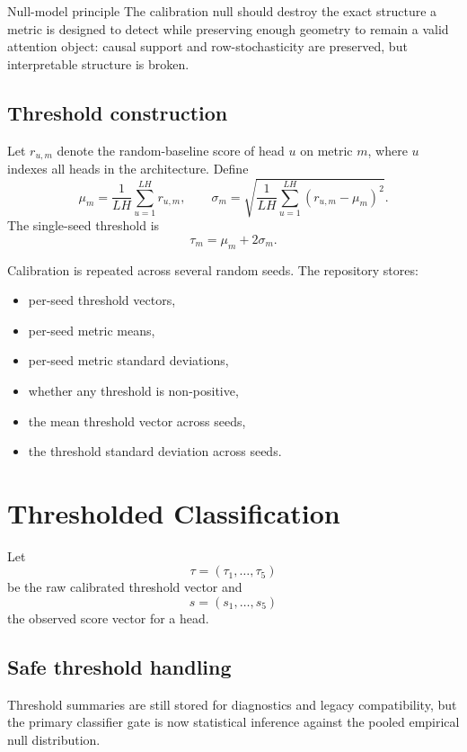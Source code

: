\documentclass[11pt]{article}
\newcommand{\1}{\mathbf{1}}
\begin{document}
\begin{accentbox}{Null-model principle}
The calibration null should destroy the exact structure a metric is designed to
detect while preserving enough geometry to remain a valid attention object:
causal support and row-stochasticity are preserved, but interpretable structure
is broken.
\end{accentbox}

\subsection{Threshold construction}

Let $r_{u,m}$ denote the random-baseline score of head $u$ on metric $m$, where
$u$ indexes all heads in the architecture. Define
\[
\mu_m = \frac{1}{LH}\sum_{u=1}^{LH} r_{u,m},
\qquad
\sigma_m =
\sqrt{
\frac{1}{LH}
\sum_{u=1}^{LH}(r_{u,m}-\mu_m)^2
}.
\]
The single-seed threshold is
\[
\tau_m = \mu_m + 2\sigma_m.
\]

Calibration is repeated across several random seeds. The repository stores:
\begin{itemize}
\item per-seed threshold vectors,
\item per-seed metric means,
\item per-seed metric standard deviations,
\item whether any threshold is non-positive,
\item the mean threshold vector across seeds,
\item the threshold standard deviation across seeds.
\end{itemize}

\section{Thresholded Classification}

Let
\[
\tau = (\tau_1,\dots,\tau_5)
\]
be the raw calibrated threshold vector and
\[
s = (s_1,\dots,s_5)
\]
the observed score vector for a head.

\subsection{Safe threshold handling}

Threshold summaries are still stored for diagnostics and legacy compatibility,
but the primary classifier gate is now statistical inference against the pooled
empirical null distribution.
\end{document}
